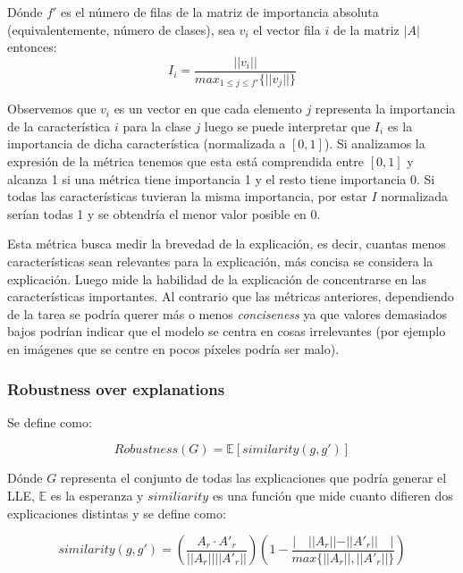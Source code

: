 Dónde $f'$ es el número de filas de la matriz de importancia absoluta (equivalentemente, número de clases), sea $v_i$ el vector fila $i$ de la matriz $|A|$ entonces:
\begin{equation}
I_i = \frac{||v_i||}{max_{1\leq  j \leq f'}\{||v_j||\}}
\end{equation}

Observemos que $v_i$ es un vector en que cada elemento $j$ representa la importancia de la característica $i$ para la clase $j$ luego se puede interpretar que $I_i$ es la importancia de dicha característica (normalizada a $[0,1]$). Si analizamos la expresión de la métrica tenemos que esta está comprendida entre $[0,1]$ y alcanza 1 si una métrica tiene importancia 1 y el resto tiene importancia 0. Si todas las características tuvieran la misma importancia, por estar $I$ normalizada serían todas 1 y se obtendría el menor valor posible en 0.

Esta métrica busca medir la brevedad de la explicación, es decir, cuantas menos características sean relevantes para la explicación, más concisa se considera la explicación. Luego mide la habilidad de la explicación de concentrarse en las características importantes. Al contrario que las métricas anteriores, dependiendo de la tarea se podría querer más o menos \textit{conciseness} ya que valores demasiados bajos podrían indicar que el modelo se centra en cosas irrelevantes (por ejemplo en imágenes que se centre en pocos píxeles podría ser malo).

\subsubsection*{Robustness over explanations}

Se define como:

\begin{equation}
Robustness(G) =  \mathbb{E}[similarity(g,g')]
\end{equation}

Dónde $G$ representa el conjunto de todas las explicaciones que podría generar el LLE, $\mathbb{E}$ es la esperanza y $similiarity$ es una función que mide cuanto difieren dos explicaciones distintas y se define como:

\begin{equation}
similarity(g,g') = \left(\frac{A_r\cdot A'_r}{||A_r|| ||A'_r||} \right)  \left(1-  \frac{|\quad  ||A_r||-||A'_r|| \quad |}{max\{||A_r||,||A'_r||\}}\right)
\end{equation}

